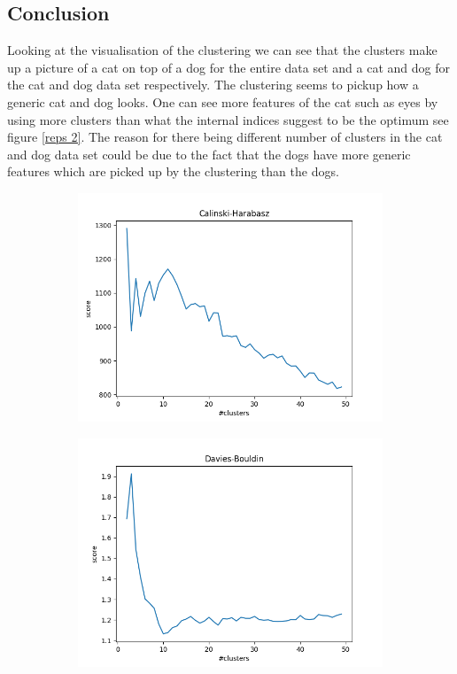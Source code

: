 \documentclass{article}
\begin{document}
\subsection{Conclusion}
Looking at the visualisation of the clustering we can see that the clusters make up a picture of a cat on top of a dog for the entire data set and a cat and dog for the cat and dog data set respectively. The clustering seems to pickup how a generic cat and dog looks. One can see more features of the cat such as eyes by using more clusters than what the internal indices suggest to be the optimum see figure \ref{reps 2}. The reason for there being different number of clusters in the cat and dog data set could be due to the fact that the dogs have more generic features which are picked up by the clustering than the dogs.   
\begin{figure}[H]
\begin{subfigure}{.33\textwidth}
  \centering
  \includegraphics[width=1\linewidth]{2f/Calinski.png}  
  
  \label{fig:sub-first}
\end{subfigure}
\begin{subfigure}{.33\textwidth}
  \centering
  \includegraphics[width=1\linewidth]{2f/Davies.png}  
  

\end{subfigure}
\end{figure}
\end{document}
